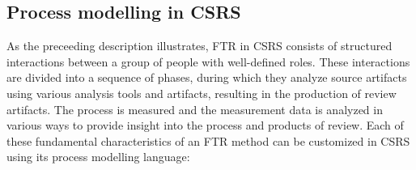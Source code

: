 \subsection{Process modelling in CSRS}

As the preceeding description illustrates, FTR in CSRS consists of
structured interactions between a group of people with well-defined roles.
These interactions are divided into a sequence of phases, during which they
analyze source artifacts using various analysis tools and artifacts,
resulting in the production of review artifacts.  The process is measured
and the measurement data is analyzed in various ways to provide insight
into the process and products of review.    Each of these fundamental
characteristics of an FTR method can be customized in CSRS using its
process modelling language:

